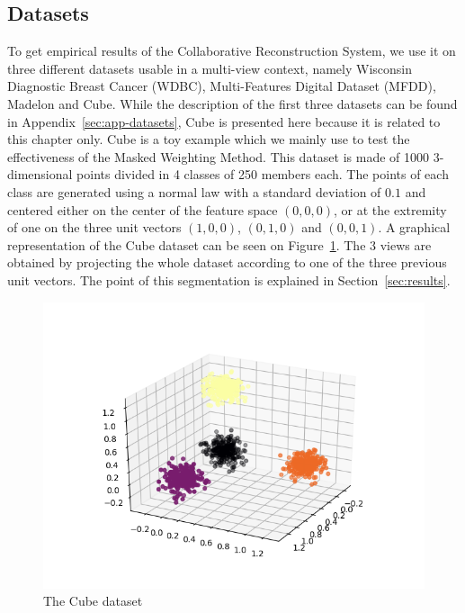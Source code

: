 	\subsection{Datasets}
\label{sec:datasets}
To get empirical results of the Collaborative Reconstruction System, we use it on three different datasets usable in a multi-view context, namely Wisconsin Diagnostic Breast Cancer (WDBC), Multi-Features Digital Dataset (MFDD), Madelon and Cube. While the description of the first three datasets can be found in Appendix~\ref{sec:app-datasets}, Cube is presented here because it is related to this chapter only.
        Cube is a toy example which we mainly use to test the effectiveness of the Masked Weighting Method. This dataset is made of 1000 3-dimensional points divided in 4 classes of 250 members each. The points of each class are generated using a normal law with a standard deviation of $0.1$ and centered either on the center of the feature space $(0,0,0)$, or at the extremity of one on the three unit vectors $(1,0,0)$, $(0,1,0)$ and $(0,0,1)$. A graphical representation of the Cube dataset can be seen on Figure~\ref{fig:cube}. The 3 views are obtained by projecting the whole dataset according to one of the three previous unit vectors. The point of this segmentation is explained in Section~\ref{sec:results}.

    \begin{figure}[h]
        \centering
        \includegraphics[scale=.7]{img/data}
        \caption{The Cube dataset}
\label{fig:cube}
    \end{figure}
	

